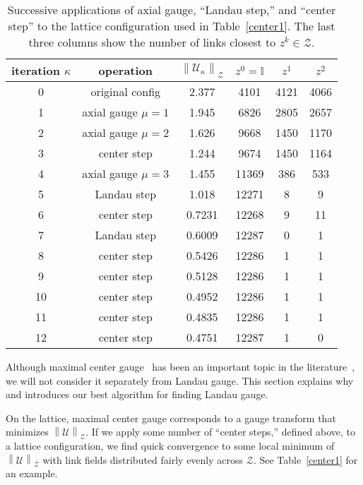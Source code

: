 \documentclass[preprint,aps,prd]{revtex4-2}
\newcommand{\zentrum}{\mathcal{Z}}       %
\newcommand{\config}{\mathcal{U}}
\newcommand\znorm[1]{\left\lVert #1 \right\rVert_\zentrum}
\begin{document}
\begin{table}
  \caption{Successive applications of axial gauge,
    ``Landau step,'' and ``center step'' to the lattice configuration
    used in Table~\ref{center1}.
    The last three columns show the number of links closest
    to $z^k \in \zentrum$.
    \label{center4}}
  \begin{tabular}{c|c|c|ccc}
    iteration $\kappa$ & operation & $\znorm{\config_\kappa}$
     & $z^0=\mathbb{I}$ & $z^1$ & $z^2$ \\
    \hline
    0 & original config    & 2.377  & 4101 & 4121 & 4066\\
    1 & axial gauge $\mu=1$& 1.945  & 6826 & 2805 & 2657\\
    2 & axial gauge $\mu=2$& 1.626  & 9668 & 1450 & 1170\\
    3 & center step        & 1.244  & 9674 & 1450 & 1164\\
    4 & axial gauge $\mu=3$& 1.455  & 11369 & 386 & 533\\
    5 & Landau step        & 1.018  & 12271 &   8 &   9\\
    6 & center step        & 0.7231 & 12268 &   9 &  11\\
    7 & Landau step        & 0.6009 & 12287 &   0 &   1\\
    8 & center step        & 0.5426 & 12286 &   1 &   1\\
    9 & center step        & 0.5128 & 12286 &   1 &   1\\
    10 & center step       & 0.4952 & 12286 &   1 &   1\\
    11 & center step       & 0.4835 & 12286 &   1 &   1\\
    12 & center step       & 0.4751 & 12287 &   1 &   0\\
  \end{tabular}
  \end{table}

Although maximal center gauge~\cite{del_debbio_center_1997}
has been an important topic in the
literature~\cite{greensite_confinement_2003},
we will not consider it separately from Landau gauge.
This section explains why and introduces our best algorithm
for finding Landau gauge.

On the lattice, maximal center gauge corresponds
to a gauge transform that minimizes $\znorm{\config}$. 
If we apply some number of ``center steps,'' defined above,
to a lattice configuration, we find quick convergence to some local
minimum of $\znorm{\config}$ with
link fields distributed fairly evenly across $\zentrum$.
See Table~\ref{center1} for an example.
\end{document}
